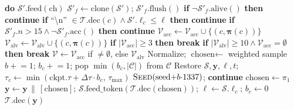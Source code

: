 \begin{algorithm}[H]
\begin{algorithmic}[1]
               \textbf{do} $\mathcal{S}'.\text{feed}(
               \text{ch})$
        \State $\mathcal{S}'_f \gets
               \text{clone}(\mathcal{S}')$;\;
               $\mathcal{S}'_f.\text{flush}()$
        \State \textbf{if} $\neg\mathcal{S}'_f
               .\text{alive}()$
               \textbf{then continue}
        \State \textbf{if} ``\textbackslash n''
               $\in \mathcal{T}.\text{dec}(c) \wedge
               \mathcal{S}'.\ell_c \le \ell$
               \textbf{then continue}
        \State \textbf{if} $\mathcal{S}'_f.n > 15
               \wedge \neg\mathcal{S}'_f.\text{acc}()$
               \textbf{then continue}
            \State $\mathcal{V}_{\text{acc}} \gets
                   \mathcal{V}_{\text{acc}} \cup
                   \{(c, \boldsymbol{\pi}(c))\}$
        \EndIf
        \State $\mathcal{V}_{\text{alv}} \gets
               \mathcal{V}_{\text{alv}} \cup
               \{(c, \boldsymbol{\pi}(c))\}$
        \State \textbf{if} $|\mathcal{V}_{\text{acc}}|
               \ge 3$ \textbf{then break}
        \State \textbf{if} $|\mathcal{V}_{\text{alv}}|
               \ge 10 \wedge
               \mathcal{V}_{\text{acc}} = \emptyset$
               \textbf{then break}
    \EndFor
    \State {}
    \State $\mathcal{V} \gets
           \mathcal{V}_{\text{acc}}$ if $\neq\emptyset$,
           else $\mathcal{V}_{\text{alv}}$
        \State Normalize;\;
               $\text{chosen} \gets$ weighted sample
        \State $b \mathrel{+}= 1$;\;
               $b_c \mathrel{+}= 1$;\;
               pop $\min(b_c, |\mathcal{C}|)$
               from $\mathcal{C}$
        \State Restore $\mathcal{S}, \mathbf{y},
               \ell, t$;\;
               $\tau_c \gets \min(\text{ckpt}.\tau
               {+} \Delta\tau {\cdot} b_c,\,
               \tau_{\max})$
        \State $\textsc{Seed}(\text{seed}
               {+} b {\cdot} 1337)$;\;
               \textbf{continue}
    \Else
        \State $\text{chosen} \gets \pi_1$
    \EndIf
    \State $\mathbf{y} \gets \mathbf{y} \,\|\,
           [\text{chosen}]$;\;
           $\mathcal{S}.\text{feed\_token}(
           \mathcal{T}.\text{dec}(\text{chosen}))$;\;
           $\ell \gets \mathcal{S}.\ell_c$;\;
           $b_c \gets 0$
\EndFor
\State \Return $\mathcal{T}.\text{dec}(\mathbf{y})$
\end{algorithmic}
\end{algorithm}


